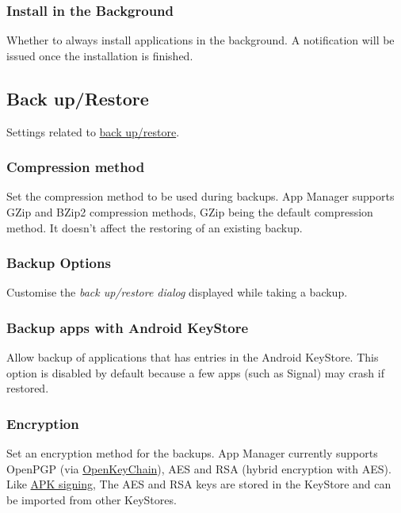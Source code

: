 \subsubsection{Install in the Background} %
Whether to always install applications in the background. A notification will be issued once the installation is finished.

\subsection{Back up/Restore}\label{subsec:backup/restore} %
Settings related to \hyperref[sec:backup-restore]{back up/restore}.

\subsubsection{Compression method} %
Set the compression method to be used during backups. App Manager supports GZip and BZip2 compression methods,
GZip being the default compression method. It doesn't affect the restoring of an existing backup.

\subsubsection{Backup Options}\label{subsubsec:settings-backup-options} %
Customise the \textit{back up/restore dialog} displayed while taking a backup.


\subsubsection{Backup apps with Android KeyStore} %
Allow backup of applications that has entries in the Android KeyStore. This option is disabled by default because a few apps (such as Signal) may crash if restored.

\subsubsection{Encryption}\label{subsubsec:settings-encryption} %
Set an encryption method for the backups. App Manager currently supports OpenPGP (via
\href{https://f-droid.org/packages/org.sufficientlysecure.keychain/}{OpenKeyChain}), AES and RSA (hybrid encryption with AES).
Like \hyperref[subsec:apk-signing]{APK signing}, The AES and RSA keys are stored in the KeyStore and can be imported from other KeyStores.

